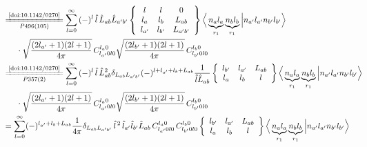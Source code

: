 \documentclass[master]{shnuthesis}
\newcommand{\ap}{a^\prime}
\newcommand{\bp}{b^\prime}
\newcommand{\il}{\!\!\!\!\!\!\!\!\!\!}
\newcommand{\zdydh}{\xlongequal}
\begin{document}
\begin{align}
    &\il \zdydh[P496(105)]{\text{\cite{doi:10.1142/0270}}} \sum_{l=0}^\infty \,(-)^l\,\hat{l}\,\hat{L}_{ab}\hat{L}_{\ap\bp}  \left\{\begin{array}{ccc} l & l & 0 \\ l_a & l_b & L_{ab} \\ l_{\ap} & l_{\bp} & L_{\ap\bp} \end{array}\right\}  \Big\langle \underbrace{n_a l_a}_{r_1} \underbrace{n_b l_b}_{r_1} \Big| n_{\ap} l_{\ap} n_{\bp} l_{\bp} \Big\rangle \notag\\
    & \cdot \sqrt{\frac{(2l_{\ap}+1)(2l+1)}{4\pi}}\,C_{l_{\ap} 0 l 0}^{l_a 0} \sqrt{\frac{(2l_{\bp}+1)(2l+1)}{4\pi}}\,C_{l_{\bp} 0 l 0}^{l_b 0} \\
    &\il \zdydh[P357(2)]{\text{\cite{doi:10.1142/0270}}} \sum_{l=0}^\infty \,(-)^l\,\hat{l}\,\hat{L}_{ab}^2 \delta_{L_{ab}L_{\ap\bp}}(-)^{l+l_{\ap}+l_b+L_{ab}}\frac{1}{\hat{l}\hat{L}_{ab}}  \left\{\begin{array}{ccc} l_{\bp} & l_{\ap} & L_{ab} \\ l_a & l_b & l \end{array}\right\}  \Big\langle \underbrace{n_a l_a}_{r_1} \underbrace{n_b l_b}_{r_1} \Big| n_{\ap} l_{\ap} n_{\bp} l_{\bp} \Big\rangle \notag\\
    & \cdot \sqrt{\frac{(2l_{\ap}+1)(2l+1)}{4\pi}}\,C_{l_{\ap} 0 l 0}^{l_a 0} \sqrt{\frac{(2l_{\bp}+1)(2l+1)}{4\pi}}\,C_{l_{\bp} 0 l 0}^{l_b 0} \\
    &\il = \sum_{l=0}^\infty (-)^{l_{\ap}+l_b+L_{ab}}\frac{1}{4\pi}\delta_{L_{ab}L_{\ap\bp}}\,\hat{l}^{\,2}\,\hat{l}_{\ap}\hat{l}_{\bp}\hat{L}_{ab}\,C_{l_{\ap} 0 l 0}^{l_a 0} \,C_{l_{\bp} 0 l 0}^{l_b 0}  \left\{\begin{array}{ccc} l_{\bp} & l_{\ap} & L_{ab} \\ l_a & l_b & l \end{array}\right\}  \Big\langle \underbrace{n_a l_a}_{r_1} \underbrace{n_b l_b}_{r_1} \Big| n_{\ap} l_{\ap} n_{\bp} l_{\bp} \Big\rangle  \label{lalb-deltar1r2}
\end{align}
\end{document}
